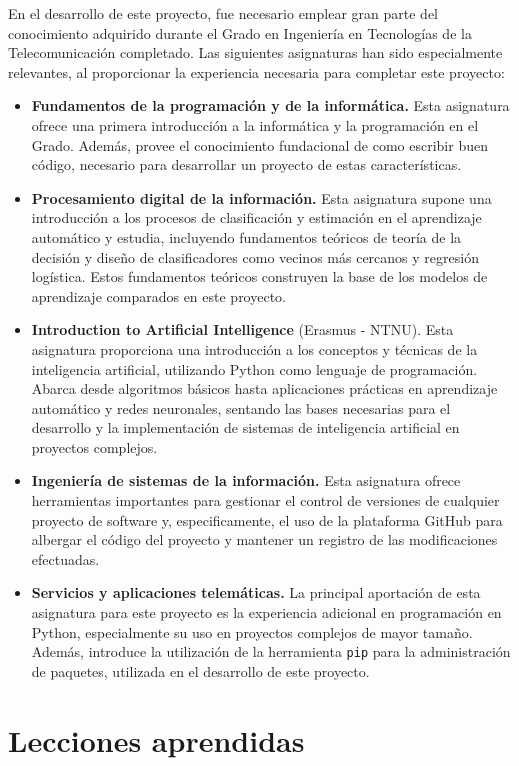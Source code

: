 En el desarrollo de este proyecto, fue necesario emplear gran parte del conocimiento adquirido durante el Grado en Ingeniería en Tecnologías de la Telecomunicación completado. Las siguientes asignaturas han sido especialmente relevantes, al proporcionar la experiencia necesaria para completar este proyecto:
\begin{itemize}
    \item \textbf{Fundamentos de la programación y de la informática.} Esta asignatura ofrece una primera introducción a la informática y la programación en el Grado. Además, provee el conocimiento fundacional de como escribir buen código, necesario para desarrollar un proyecto de estas características.
    \item \textbf{Procesamiento digital de la información.} Esta asignatura supone una introducción a los procesos de clasificación y estimación en el aprendizaje automático y estudia, incluyendo fundamentos teóricos de teoría de la decisión y diseño de clasificadores como vecinos más cercanos y regresión logística. Estos fundamentos teóricos construyen la base de los modelos de aprendizaje comparados en este proyecto.
    \item \textbf{Introduction to Artificial Intelligence} (Erasmus - NTNU). Esta asignatura proporciona una introducción a los conceptos y técnicas de la inteligencia artificial, utilizando Python como lenguaje de programación. Abarca desde algoritmos básicos hasta aplicaciones prácticas en aprendizaje automático y redes neuronales, sentando las bases necesarias para el desarrollo y la implementación de sistemas de inteligencia artificial en proyectos complejos.
    \item \textbf{Ingeniería de sistemas de la información.} Esta asignatura ofrece herramientas importantes para gestionar el control de versiones de cualquier proyecto de software y, especificamente, el uso de la plataforma GitHub para albergar el código del proyecto y mantener un registro de las modificaciones efectuadas.
    \item \textbf{Servicios y aplicaciones telemáticas.} La principal aportación de esta asignatura para este proyecto es la experiencia adicional en programación en Python, especialmente su uso en proyectos complejos de mayor tamaño. Además, introduce la utilización de la herramienta \texttt{pip} para la administración de paquetes, utilizada en el desarrollo de este proyecto.
\end{itemize}

\section{Lecciones aprendidas}
\label{sec:lecciones_aprendidas}

